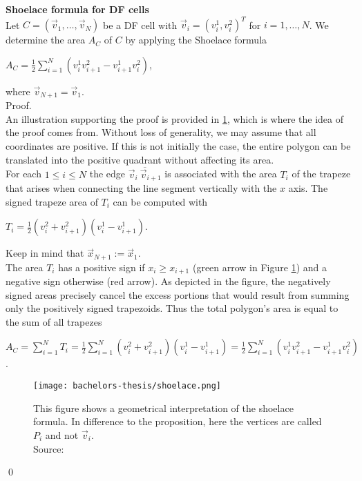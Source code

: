 \begin{proposition}  \textbf{Shoelace formula for DF cells} \label{prop:Shoelace}\\ 
	Let $C = (\vec{v}_1, \ldots, \vec{v}_N)$ be a DF cell with $\vec{v}_i = (v_i^1, v_i^2)^T$ for $i=1,\ldots,N$.
	We determine the area $A_C$ of $C$ by applying the Shoelace formula
	\begin{center}
		$A_C = \frac{1}{2}\sum\limits_{i = 1}^{N} (v_i^1 v_{i+1}^2 - v_{i+1}^1 v_i^2)$,
	\end{center} 
	where $\vec{v}_{N + 1} = \vec{v}_1$. \\
	Proof. 	\\
	An illustration supporting the proof is provided in \ref{fig:shoelace}, which is where the idea of the proof comes from. 
	Without loss of generality, we may assume that all coordinates are positive.
	If this is not initially the case, the entire polygon can be translated into the positive quadrant without affecting its area. \\
	For each $1 \leq i \leq N$ the edge $\overline{ \vec{v}_i \: \vec{v}_{i+1}}$ is associated with the area $T_i$ of the trapeze that arises when connecting the line segment vertically with the $x$ axis. 
	The signed trapeze area of $T_i$ can be computed with 
	\begin{center}
		$T_i = \frac{1}{2} (v_i^2 + v_{i+1}^2)(v_i^1 - v_{i+1}^1)$.
	\end{center}
	Keep in mind that $\vec{x}_{N + 1} := \vec{x}_1$. \\
	The area $T_i$ has a positive sign if $x_i \geq x_{i+1}$ (green arrow in Figure \ref{fig:shoelace}) and a negative sign otherwise (red arrow). 
	As depicted in the figure, the negatively signed areas precisely cancel the excess portions that would result from summing only the positively signed trapezoids.
	Thus the total polygon's area is equal to the sum of all trapezes
	\begin{center}
		$A_C = \sum\limits_{i = 1}^{N} T_i = \frac{1}{2} \sum\limits_{i = 1}^{N} (v_i^2 + v_{i+1}^2)(v_i^1 - v_{i+1}^1) = \frac{1}{2}\sum\limits_{i = 1}^{N} (v_i^1 v_{i+1}^2 - v_{i+1}^1 v_i^2) $.
	\end{center} 
	\begin{figure}[h!]
		\begin{center}
			\texttt{[image: bachelors-thesis/shoelace.png]}
			\caption{
				This figure shows a geometrical interpretation of the shoelace formula. In difference to the proposition, here the vertices are called $P_i$ and not $\vec{v}_i$. \\
				Source: \cite{ShoelaceFigure2022}}
			\label{fig:shoelace}
		\end{center}
	\end{figure}
	\qed
\end{proposition}

